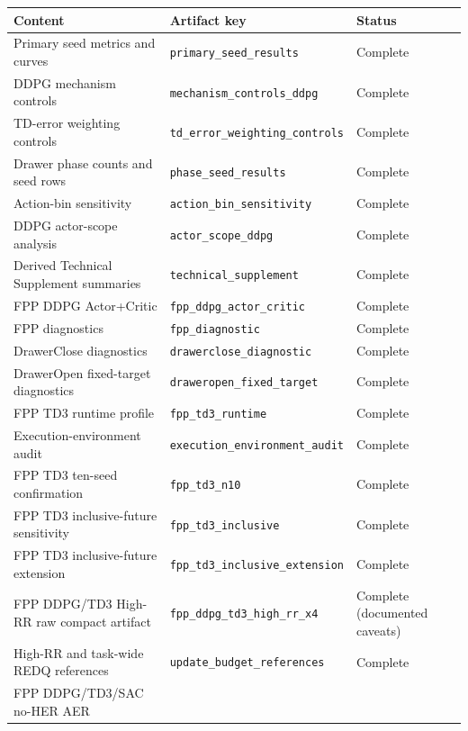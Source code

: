 \begin{table}[t]
\centering
\small
\setlength{\tabcolsep}{5pt}
\begin{tabular}{>{\raggedright\arraybackslash}p{}
                >{\raggedright\arraybackslash}p{}
                >{\raggedright\arraybackslash}p{}}
\toprule
Content & Artifact key & Status \\
\midrule
Primary seed metrics and curves &
\texttt{primary\_seed\_results} & Complete \\
DDPG mechanism controls &
\texttt{mechanism\_controls\_ddpg} & Complete \\
TD-error weighting controls &
\texttt{td\_error\_weighting\_controls} & Complete \\
Drawer phase counts and seed rows &
\texttt{phase\_seed\_results} & Complete \\
Action-bin sensitivity &
\texttt{action\_bin\_sensitivity} & Complete \\
DDPG actor-scope analysis &
\texttt{actor\_scope\_ddpg} & Complete \\
Derived Technical Supplement summaries &
\texttt{technical\_supplement} & Complete \\
FPP DDPG Actor+Critic &
\texttt{fpp\_ddpg\_actor\_critic} & Complete \\
FPP diagnostics &
\texttt{fpp\_diagnostic} & Complete \\
DrawerClose diagnostics &
\texttt{drawerclose\_diagnostic} & Complete \\
DrawerOpen fixed-target diagnostics &
\texttt{draweropen\_fixed\_target} & Complete \\
FPP TD3 runtime profile &
\texttt{fpp\_td3\_runtime} & Complete \\
Execution-environment audit &
\texttt{execution\_environment\_audit} & Complete \\
FPP TD3 ten-seed confirmation &
\texttt{fpp\_td3\_n10} & Complete \\
FPP TD3 inclusive-future sensitivity &
\texttt{fpp\_td3\_inclusive} & Complete \\
FPP TD3 inclusive-future extension &
\texttt{fpp\_td3\_inclusive\_extension} & Complete \\
FPP DDPG/TD3 High-RR raw compact artifact &
\texttt{fpp\_ddpg\_td3\_high\_rr\_x4} &
Complete (documented caveats) \\
High-RR and task-wide REDQ references &
\texttt{update\_budget\_references} & Complete \\
FPP DDPG/TD3/SAC no-HER AER &

\end{tabular}
\end{table}

